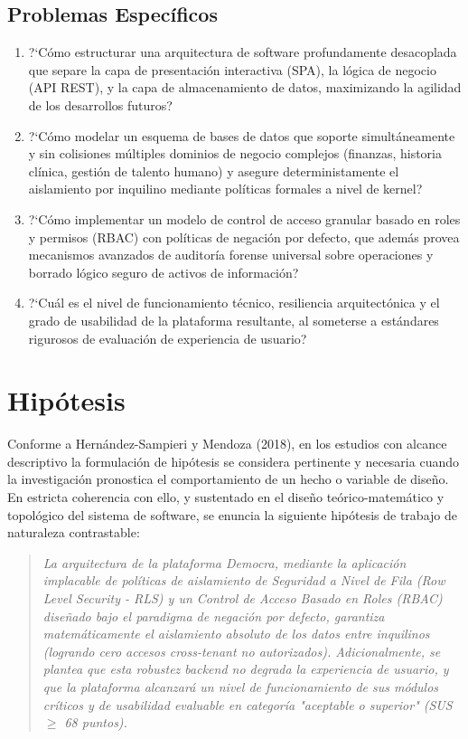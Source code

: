 \documentclass[11pt,a4paper,oneside]{report}
\begin{document}
\subsection{Problemas Espec\'ificos}
\begin{enumerate}[label=\alph*.]
    \item ?`C\'omo estructurar una arquitectura de software profundamente desacoplada que separe la capa de presentaci\'on interactiva (SPA), la l\'ogica de negocio (API REST), y la capa de almacenamiento de datos, maximizando la agilidad de los desarrollos futuros?
    \item ?`C\'omo modelar un esquema de bases de datos que soporte simult\'aneamente y sin colisiones m\'ultiples dominios de negocio complejos (finanzas, historia cl\'inica, gesti\'on de talento humano) y asegure deterministamente el aislamiento por inquilino mediante pol\'iticas formales a nivel de kernel?
    \item ?`C\'omo implementar un modelo de control de acceso granular basado en roles y permisos (RBAC) con pol\'iticas de negaci\'on por defecto, que adem\'as provea mecanismos avanzados de auditor\'ia forense universal sobre operaciones y borrado l\'ogico seguro de activos de informaci\'on?
    \item ?`Cu\'al es el nivel de funcionamiento t\'ecnico, resiliencia arquitect\'onica y el grado de usabilidad de la plataforma resultante, al someterse a est\'andares rigurosos de evaluaci\'on de experiencia de usuario?
\end{enumerate}

\section{Hip\'otesis}
\label{section:hipotesis}
Conforme a Hernández-Sampieri y Mendoza (2018), en los estudios con alcance descriptivo la formulaci\'on de hip\'otesis se considera pertinente y necesaria cuando la investigaci\'on pronostica el comportamiento de un hecho o variable de dise\~no. En estricta coherencia con ello, y sustentado en el dise\~no te\'orico-matem\'atico y topol\'ogico del sistema de software, se enuncia la siguiente hip\'otesis de trabajo de naturaleza contrastable:

\begin{quote}
\itshape La arquitectura de la plataforma Democra, mediante la aplicaci\'on implacable de pol\'iticas de aislamiento de Seguridad a Nivel de Fila (Row Level Security - RLS) y un Control de Acceso Basado en Roles (RBAC) dise\~nado bajo el paradigma de negaci\'on por defecto, garantiza matem\'aticamente el aislamiento absoluto de los datos entre inquilinos (logrando cero accesos \textit{cross-tenant} no autorizados). Adicionalmente, se plantea que esta robustez backend no degrada la experiencia de usuario, y que la plataforma alcanzar\'a un nivel de funcionamiento de sus m\'odulos cr\'iticos y de usabilidad evaluable en categor\'ia "aceptable o superior" (SUS $\geq$ 68 puntos).
\end{quote}
\end{document}
